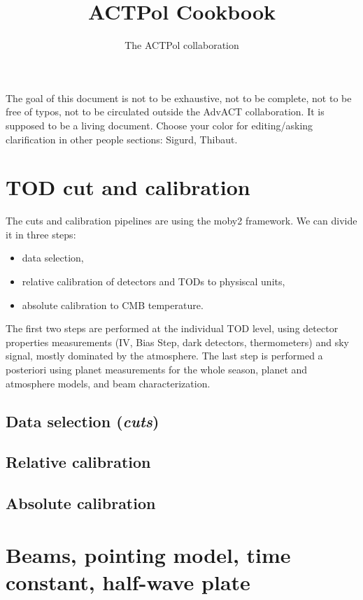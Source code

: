 \documentclass[a4paper, 11pt]{article}
\newcommand{\skn}[1]{{\color{red}#1}}
\newcommand{\TIB}[1]{{\color{blue}#1}}
\begin{document}
\title{\textbf{ACTPol Cookbook}}
\author{The ACTPol collaboration}
\maketitle

The goal of this document is not to be exhaustive, not to be complete, not
to be free of typos, not to be circulated outside the AdvACT collaboration.
It is supposed to be a living document.  Choose your color for
editing/asking clarification in other people sections: \skn{Sigurd}, \TIB{Thibaut}.

\section{TOD cut and calibration}

The cuts and calibration pipelines are using the moby2 framework. We can divide it in three steps:
\begin{itemize}
\item data selection,
\item relative calibration of detectors and TODs to physiscal units,
\item absolute calibration to CMB temperature.
\end{itemize}
The first two steps are performed at the individual TOD level, using detector properties measurements (IV, Bias Step, dark detectors, thermometers) and sky signal, mostly dominated by the atmosphere. The last step is performed a posteriori using planet measurements for the whole season, planet and atmosphere models, and beam characterization.

\subsection{Data selection (\emph{cuts})}

\subsection{Relative calibration}

\subsection{Absolute calibration}



\section{Beams, pointing model, time constant, half-wave plate}
\end{document}

